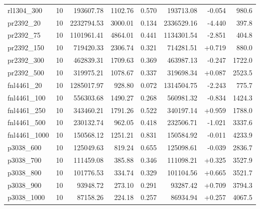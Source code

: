 \begin{table}[!htb]
\begin{tabular}{lrrrrrrr}
rl1304\_300 & 10 & 193607.78 & 1102.76 & 0.570 & 193713.08 & -0.054 & 980.6 \\
pr2392\_20 & 10 & 2232794.53 & 3000.01 & 0.134 & 2336529.16 & -4.440 & 397.8 \\
pr2392\_75 & 10 & 1101961.41 & 4864.01 & 0.441 & 1134301.54 & -2.851 & 404.8 \\
pr2392\_150 & 10 & 719420.33 & 2306.74 & 0.321 & 714281.51 & +0.719 & 880.0 \\
pr2392\_300 & 10 & 462839.31 & 1709.63 & 0.369 & 463987.13 & -0.247 & 1722.0 \\
pr2392\_500 & 10 & 319975.21 & 1078.67 & 0.337 & 319698.34 & +0.087 & 2523.5 \\
fnl4461\_20 & 10 & 1285017.97 & 928.80 & 0.072 & 1314504.75 & -2.243 & 775.7 \\
fnl4461\_100 & 10 & 556303.68 & 1490.27 & 0.268 & 560981.32 & -0.834 & 1424.3 \\
fnl4461\_250 & 10 & 343460.21 & 1791.26 & 0.522 & 340197.14 & +0.959 & 1788.0 \\
fnl4461\_500 & 10 & 230132.74 & 962.05 & 0.418 & 232506.71 & -1.021 & 3337.6 \\
fnl4461\_1000 & 10 & 150568.12 & 1251.21 & 0.831 & 150584.92 & -0.011 & 4233.9 \\
p3038\_600 & 10 & 125049.63 & 819.24 & 0.655 & 125098.61 & -0.039 & 2836.7 \\
p3038\_700 & 10 & 111459.08 & 385.88 & 0.346 & 111098.21 & +0.325 & 3527.9 \\
p3038\_800 & 10 & 101776.53 & 334.74 & 0.329 & 101104.56 & +0.665 & 3521.7 \\
p3038\_900 & 10 & 93948.72 & 273.10 & 0.291 & 93287.42 & +0.709 & 3794.3 \\
p3038\_1000 & 10 & 87158.26 & 224.18 & 0.257 & 86934.94 & +0.257 & 4067.5 \\
\hline
\end{tabular}
\end{table}
